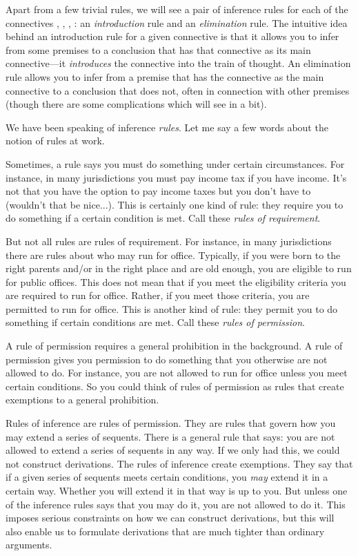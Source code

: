 Apart from a few trivial rules, we will see a pair of inference rules for each 
of the connectives \p{\lnot}, \p{\land}, \p{\lor}, \p{\limplies}:  an 
\emph{introduction} rule and an \emph{elimination} rule. The intuitive idea 
behind an introduction rule for a given connective  is that it allows you to 
infer from some premises to a conclusion that has that connective as its main 
connective---it \emph{introduces} the connective into the train of thought.  An 
elimination rule allows you to infer from a premise that has the connective as 
the main connective to a conclusion that does not, often in connection with 
other premises (though there are some complications which will see in a bit). 

We have been speaking of inference \emph{rules}. Let me say a few words about 
the notion of rules at work.

Sometimes, a rule says you must do something under certain circumstances.  For 
instance, in many jurisdictions you must pay income tax if you have income.  
It's not that you have the option to pay income taxes but you don't have to 
(wouldn't that be nice...).  This is certainly one kind of rule: they require 
you to do something if a certain condition is met. Call these \emph{rules of 
requirement}.

But not all rules are rules of requirement. For instance, in many jurisdictions 
there are rules about who may run for office. Typically, if you were born to the 
right parents and/or in the right place and are old enough, you are eligible to 
run for public offices. This does not mean that if you meet the eligibility 
criteria you are required to run for office. Rather, if you meet those criteria, 
you are permitted to run for office. This is another kind of rule: they permit 
you to do something if certain conditions are met. Call these \emph{rules of 
permission}.

A rule of permission requires a general prohibition in the background. A rule of 
permission gives you permission to do something that you otherwise are not 
allowed to do. For instance, you are not allowed to run for office unless you 
meet certain conditions. So you could think of rules of permission as rules that 
create exemptions to a general prohibition. 

Rules of inference are rules of permission. They are rules that govern how you 
may extend a series of sequents. There is a general rule that says: you are not 
allowed to extend a series of sequents in any way. If we only had this, we could 
not construct derivations. The rules of inference create exemptions.  They say 
that if a given series of sequents meets certain conditions, you \emph{may} 
extend it in a certain way.  Whether you will extend it in that way is up to 
you. But unless one of the inference rules says that you may do it, you are not 
allowed to do it.  This imposes serious constraints on how we can construct 
derivations, but this will also enable us to formulate derivations that are much 
tighter than ordinary arguments.

